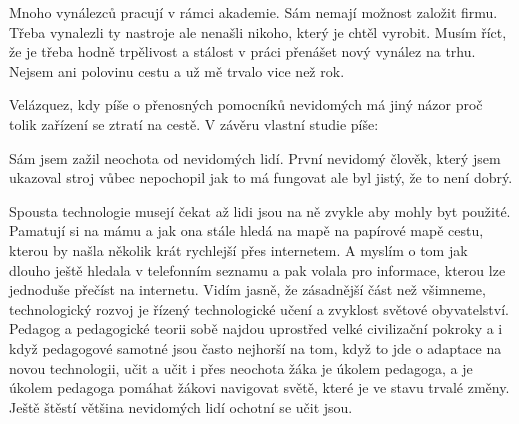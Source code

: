 Mnoho vynálezců pracují v rámci akademie. Sám nemají možnost založit firmu. Třeba vynalezli ty nastroje ale nenašli nikoho, který je chtěl vyrobit. Musím říct, že je třeba hodně trpělivost a stálost v práci přenášet nový vynález na trhu.  Nejsem ani polovinu cestu a už mě trvalo vice než rok.

Velázquez, kdy píše o přenosných pomocníků nevidomých má jiný názor proč tolik zařízení se ztratí na cestě.  V závěru vlastní studie píše:
\em
{}\em \citep{velazquez2010wearable}%

Sám jsem zažil neochota od nevidomých lidí. První nevidomý člověk, který jsem ukazoval stroj vůbec nepochopil jak to má fungovat ale byl jistý, že to není dobrý.

Spousta technologie musejí čekat až lidi jsou na ně zvykle aby mohly byt použité.  Pamatují si na mámu a jak ona stále hledá na mapě na papírové mapě cestu, kterou by našla několik krát rychlejší přes internetem.  A myslím o tom jak dlouho ještě hledala v telefonním seznamu a pak volala pro informace, kterou lze jednoduše přečíst na internetu.  Vidím jasně, že zásadnější část než všimneme, technologický rozvoj je řízený technologické učení a zvyklost světové obyvatelství.  Pedagog a pedagogické teorii sobě najdou uprostřed velké civilizační pokroky a i když pedagogové samotné jsou často nejhorší na tom, když to jde o adaptace na novou technologii, učit a učit i přes neochota žáka je úkolem pedagoga, a je úkolem pedagoga pomáhat žákovi navigovat světě, které je ve stavu trvalé změny.  Ještě štěstí většina nevidomých lidí ochotní se učit jsou.

